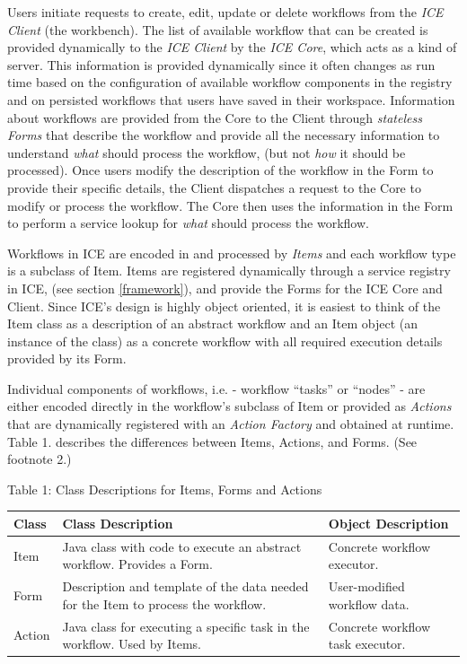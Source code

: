 Users initiate requests to create, edit, update or delete workflows from
the \emph{ICE Client} (the workbench). The list of available workflow
that can be created is provided dynamically to the \emph{ICE Client} by
the \emph{ICE Core}, which acts as a kind of server. This information is
provided dynamically since it often changes as run time based on the
configuration of available workflow components in the registry and on
persisted workflows that users have saved in their workspace.
Information about workflows are provided from the Core to the Client
through \emph{stateless Forms} that describe the workflow and provide
all the necessary information to understand \emph{what} should process
the workflow, (but not \emph{how} it should be processed). Once users
modify the description of the workflow in the Form to provide their
specific details, the Client dispatches a request to the Core to modify
or process the workflow. The Core then uses the information in the Form
to perform a service lookup for \emph{what} should process the workflow.

Workflows in ICE are encoded in and processed by \emph{Items} and each
workflow type is a subclass of Item. Items are registered dynamically
through a service registry in ICE, (see section \ref{framework}), and
provide the Forms for the ICE Core and Client. Since ICE's design is
highly object oriented, it is easiest to think of the Item class as a
description of an abstract workflow and an Item object (an instance of
the class) as a concrete workflow with all required execution details
provided by its Form.

Individual components of workflows, i.e. - workflow ``tasks'' or
``nodes'' - are either encoded directly in the workflow's subclass of
Item or provided as \emph{Actions} that are dynamically registered with
an \emph{Action Factory} and obtained at runtime. Table 1. describes the
differences between Items, Actions, and Forms. (See footnote 2.)

Table 1: Class Descriptions for Items, Forms and Actions

\begin{longtable}[c]{@{}lll@{}}
\toprule
Class & Class Description & Object Description\tabularnewline
\midrule
\endhead
Item & Java class with code to execute an abstract workflow. Provides a
Form. & Concrete workflow executor.\tabularnewline
Form & Description and template of the data needed for the Item to
process the workflow. & User-modified workflow data.\tabularnewline
Action & Java class for executing a specific task in the workflow. Used
by Items. & Concrete workflow task executor.\tabularnewline
\bottomrule
\end{longtable}

